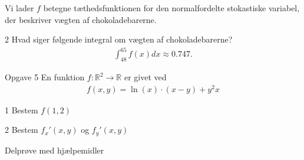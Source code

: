 \begin{meretekst}
	Vi lader $f$ betegne tæthedsfunktionen for den normalfordelte stokastiske variabel, der beskriver vægten af chokoladebarerne. 
\end{meretekst}
\begin{delopgave}{}{2}
	Hvad siger følgende integral om vægten af chokoladebarerne?
	\begin{align*}
		\int_{48}^{65} f(x)dx \approx  0.747.
	\end{align*}
\end{delopgave}
\begin{opgavetekst}{Opgave 5}
	En funktion $f:\mathbb{R}^2 \to \mathbb{R}$ er givet ved
	\begin{align*}
		f(x,y) = \ln(x)\cdot(x-y) + y^2x
	\end{align*}
\end{opgavetekst}
\begin{delopgave}{}{1}
	Bestem $f(1,2)$
\end{delopgave}
\begin{delopgave}{}{2}
	Bestem $f_x'(x,y)$ og $f_y'(x,y)$
\end{delopgave}




\newpage
\begin{center}
\LARGE
Delprøve med hjælpemidler 
\end{center}


